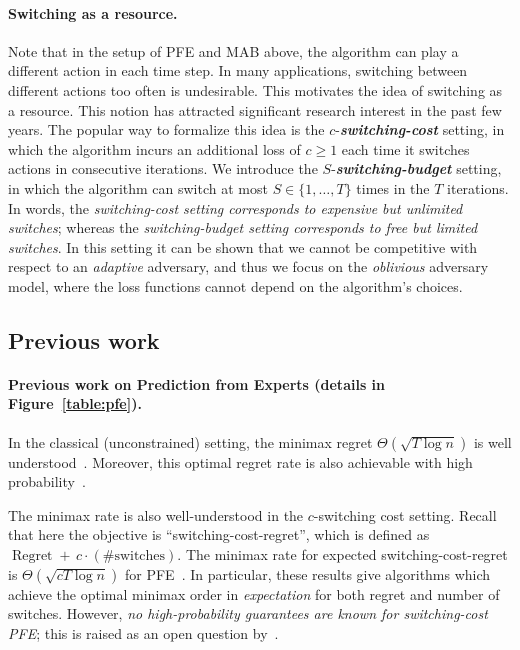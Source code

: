 \documentclass[final,12pt]{colt2018}
\DeclareMathOperator{\Regret}{\text{Regret}}
\begin{document}
\paragraph*{Switching as a resource.} Note that in the setup of PFE and MAB above, the algorithm can play a different action in each time step. In many applications, switching between different actions too often is undesirable. This motivates the idea of switching as a resource. This notion has attracted significant research interest in the past few years. The popular way to formalize this idea is the $c$-\textbf{\textit{switching-cost}} setting, in which the algorithm incurs an additional loss of $c \geq 1$ each time it switches actions in consecutive iterations. We introduce the $S$-\textbf{\textit{switching-budget}} setting, in which the algorithm can switch at most $S \in \{1, \dots, T\}$ times in the $T$ iterations. In words, the \textit{switching-cost setting corresponds to expensive but unlimited switches}; whereas the \textit{switching-budget setting corresponds to free but limited switches}. In this setting it can be shown that we cannot be competitive with respect to an {\em adaptive} adversary, and thus we focus on the {\em oblivious} adversary model, where the loss functions cannot depend on the algorithm's choices.

\subsection{Previous work}\label{subsec:previous-work}
\paragraph*{Previous work on Prediction from Experts (details in Figure~\ref{table:pfe}).} In the classical (unconstrained) setting, the minimax regret $\Theta(\sqrt{T\log n})$ is well understood~\citep{Lit94,FreSch97,CB-expert}. Moreover, this optimal regret rate is also achievable with high probability~\citep{Book-CB-Lugosi}.
\par The minimax rate is also well-understood in the $c$-switching cost setting. Recall that here the objective is ``switching-cost-regret'', which is defined as $\Regret +\,c\cdot(\text{\# switches})$. The minimax rate for expected switching-cost-regret is $\Theta(\sqrt{cT \log n})$ for PFE~\citep{KalVem,Dartboard,DevLugNeu15}. In particular, these results give algorithms which achieve the optimal minimax order in \textit{expectation} for both regret and number of switches. However, \textit{no high-probability guarantees are known for switching-cost PFE}; this is raised as an open question by~\citep{DevLugNeu15}.
\end{document}
